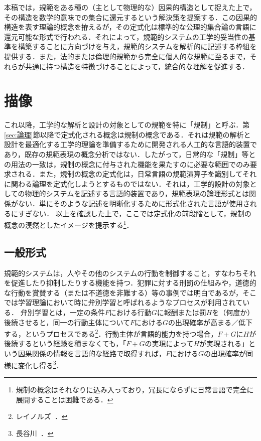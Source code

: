 本稿では，規範をある種の（主として物理的な）因果的構造として捉えた上で，その構造を数学的意味での集合に還元するという解決策を提案する．この因果的構造を表す理論的概念を拵えるが，その定式化は標準的な公理的集合論の言語に還元可能な形式で行われる．それによって，規範的システムの工学的妥当性の基準を構築することに方向づけを与え，規範的システムを解析的に記述する枠組を提供する．また，法的または倫理的規範から完全に個人的な規範に至るまで，それらが共通に持つ構造を特徴づけることによって，統合的な理解を促進する．

\section{描像}

これ以降，工学的な解析と設計の対象としての規範を特に「規制」と呼ぶ．第 \ref{sec:論理}節以降で定式化される概念は規制の概念である．それは規範の解析と設計を最適化する工学的理論を準備するために開発される人工的な言語的装置であり，既存の規範表現の概念分析ではない．したがって，日常的な「規制」等との用法の一致は，規制の概念に付与された機能を果たすのに必要な範囲でのみ要求される．また，規制の概念の定式化は，日常言語の規範演算子を識別してそれに関わる論理を定式化しようとするものではない．それは，工学的設計の対象としての物理的システムを記述する言語的装置であり，規範表現の論理形式とは関係がない．単にそのような記述を明晰化するために形式化された言語が使用されるにすぎない．
以上を確認した上で，ここでは定式化の前段階として，規制の概念の漠然としたイメージを提示する\footnote{規制の概念はそれなりに込み入っており，冗長にならずに日常言語で完全に展開することは困難である．}．

\subsection{一般形式}

規範的システムは，人やその他のシステムの行動を制御すること，すなわちそれを促進したり抑制したりする機能を持つ．犯罪に対する刑罰の仕組みや，道徳的な行動を賞賛する（または不道徳を非難する）等の事例では明白であるが，そこでは学習理論において時に弁別学習と呼ばれるようなプロセスが利用されている．
弁別学習とは，一定の条件$F$における行動$G$に報酬または罰$H$を（何度か）後続させると，同一の行動主体について$F$における$G$の出現確率が高まる／低下する，というプロセスである\footnote{レイノルズ~\cite[pp.\,9--12]{レイノルズ}．}．行動主体が言語的能力を持つ場合，$F+G$に$H$が後続するという経験を積まなくても，「$F+G$の実現によって$H$が実現される」という因果関係の情報を言語的な経路で取得すれば，$F$における$G$の出現確率が同様に変化し得る\footnote{長谷川~\cite[p.\,4]{長谷川}．}．

